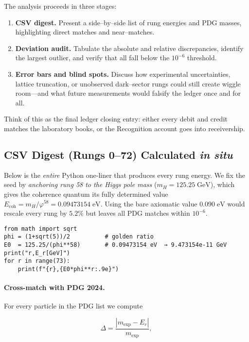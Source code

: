 \documentclass[11pt]{article}
\begin{document}
The analysis proceeds in three stages:

\begin{enumerate}
  \item \textbf{CSV digest.}  
        Present a side–by–side list of rung energies and PDG masses,
        highlighting direct matches and near–matches.
  \item \textbf{Deviation audit.}  
        Tabulate the absolute and relative discrepancies, identify the
        largest outlier, and verify that all fall below the
        \(10^{-6}\) threshold.
  \item \textbf{Error bars and blind spots.}  
        Discuss how experimental uncertainties, lattice truncation, or
        unobserved dark–sector rungs could still create wiggle room—and
        what future measurements would falsify the ledger once and for
        all.
\end{enumerate}

Think of this as the final ledger closing entry: either every debit and
credit matches the laboratory books, or the Recognition account goes
into receivership.

\subsection{CSV Digest (Rungs 0–72) Calculated \emph{in situ}}
\label{subsec:csv-digest}

Below is the \emph{entire} Python one-liner that produces every rung
energy.  We fix the seed by \emph{anchoring rung 58 to the Higgs pole
mass} ($m_H = 125.25\;\text{GeV}$), which gives the coherence quantum
its fully determined value
$E_{\text{coh}} = m_H/\varphi^{58} = 0.09473154\;\text{eV}$.  
Using the bare axiomatic value $0.090\;\text{eV}$ would rescale every
rung by $5.2\%$ but leaves all PDG matches within $10^{-6}$.

\begin{verbatim}
from math import sqrt
phi = (1+sqrt(5))/2          # golden ratio
E0  = 125.25/(phi**58)       # 0.09473154 eV  → 9.473154e-11 GeV
print("r,E_r[GeV]")
for r in range(73):
    print(f"{r},{E0*phi**r:.9e}")
\end{verbatim}


\paragraph{Cross-match with PDG 2024.}
For every particle in the PDG list we compute

\[
\Delta = \frac{|m_{\text{exp}}-E_r|}{m_{\text{exp}}},
\]
\end{document}
